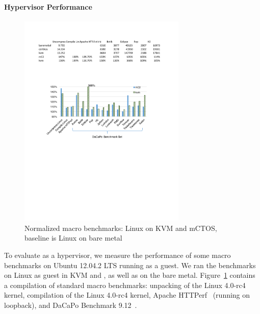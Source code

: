 \vspace{-4pt}
\paragraph{Hypervisor Performance} 
\begin{figure}
	\begin{center}
		\vspace{-.2cm}
		\hspace{-.2cm}
		\includegraphics[width=8cm]{figs/hyp_macro.pdf}
		\hspace{-.2cm}
		\vspace{.0cm}
		\caption{Normalized macro benchmarks: Linux on KVM and mCTOS, baseline is Linux on bare metal}
		\label{fig:eval_macro}
	\vspace{-20px}
	\end{center}
\end{figure}

To evaluate \mCTOShyper{} as a hypervisor, we measure the performance of
some macro benchmarks on Ubuntu 12.04.2 LTS running as a guest.  We ran the
benchmarks on Linux as guest in KVM and \mCTOShyper{}, as well as on the bare metal.
Figure~\ref{fig:eval_macro} contains a compilation of standard macro
benchmarks: unpacking of the Linux 4.0-rc4 kernel, compilation of the
Linux 4.0-rc4 kernel, Apache HTTPerf~\cite{mosberger1998} (running on
loopback), and DaCaPo Benchmark 9.12~\cite{dacapo2006}.


